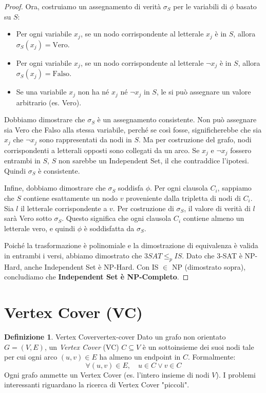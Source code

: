 \documentclass[a4paper]{article}
\theoremstyle{definition} %
\newtheorem{definition}{Definizione}[section]
\theoremstyle{definition} %
\begin{document}
\begin{proof}
Ora, costruiamo un assegnamento di verità $\sigma_S$ per le variabili di $\phi$ basato su $S$:
\begin{itemize}
    \item Per ogni variabile $x_j$, se un nodo corrispondente al letterale $x_j$ è in $S$, allora $\sigma_S(x_j) = \text{Vero}$.
    \item Per ogni variabile $x_j$, se un nodo corrispondente al letterale $\neg x_j$ è in $S$, allora $\sigma_S(x_j) = \text{Falso}$.
    \item Se una variabile $x_j$ non ha né $x_j$ né $\neg x_j$ in $S$, le si può assegnare un valore arbitrario (es. Vero).
\end{itemize}
Dobbiamo dimostrare che $\sigma_S$ è un assegnamento consistente. Non può assegnare sia Vero che Falso alla stessa variabile, perché se così fosse, significherebbe che sia $x_j$ che $\neg x_j$ sono rappresentati da nodi in $S$. Ma per costruzione del grafo, nodi corrispondenti a letterali opposti sono collegati da un arco. Se $x_j$ e $\neg x_j$ fossero entrambi in $S$, $S$ non sarebbe un Independent Set, il che contraddice l'ipotesi. Quindi $\sigma_S$ è consistente.

Infine, dobbiamo dimostrare che $\sigma_S$ soddisfa $\phi$.
Per ogni clausola $C_i$, sappiamo che $S$ contiene esattamente un nodo $v$ proveniente dalla tripletta di nodi di $C_i$. Sia $l$ il letterale corrispondente a $v$. Per costruzione di $\sigma_S$, il valore di verità di $l$ sarà Vero sotto $\sigma_S$. Questo significa che ogni clausola $C_i$ contiene almeno un letterale vero, e quindi $\phi$ è soddisfatta da $\sigma_S$.

Poiché la trasformazione è polinomiale e la dimostrazione di equivalenza è valida in entrambi i versi, abbiamo dimostrato che $3SAT \le_p IS$. Dato che 3-SAT è NP-Hard, anche Independent Set è NP-Hard. Con IS $\in$ NP (dimostrato sopra), concludiamo che \textbf{Independent Set è NP-Completo}.
\end{proof}

\section{Vertex Cover (VC)}

\begin{definition}{Vertex Cover}{vertex-cover}
Dato un grafo non orientato $G=(V, E)$, un \emph{Vertex Cover} (VC) $C \subseteq V$ è un sottoinsieme dei suoi nodi tale per cui ogni arco $(u,v) \in E$ ha almeno un endpoint in $C$. Formalmente:
\[ \forall (u, v) \in E, \quad u \in C \lor v \in C \]
Ogni grafo ammette un Vertex Cover (es. l'intero insieme di nodi $V$). I problemi interessanti riguardano la ricerca di Vertex Cover "piccoli".
\end{definition}
\end{document}
